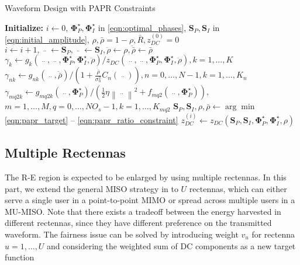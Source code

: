 \begin{algorithm}
  \caption{Waveform Design with PAPR Constraints}
  \label{alg:papr}
  \begin{algorithmic}[1]
    \State \textbf{Initialize:} $i \leftarrow 0$, ${\mathbf{\Phi }}_P^ \star ,{\mathbf{\Phi }}_I^ \star $ in \eqref{eqn:optimal_phases}, ${{{\mathbf{S}}_P},{{\mathbf{S}}_I}}$ in \eqref{eqn:initial_amplitude}, $\rho ,\bar \rho  = 1 - \rho ,\bar R,z_{DC}^{(0)} = 0$
    \Repeat
      \State $i \leftarrow i + 1,\mathop {{{\mathbf{S}}_P}}\limits^{..}  \leftarrow {{\mathbf{S}}_P},\mathop {{{\mathbf{S}}_I}}\limits^{..}  \leftarrow {{\mathbf{S}}_I},\ddot \rho  \leftarrow \rho ,\ddot{\bar{\rho}}  \leftarrow \bar \rho $
      \State ${\gamma _k} \leftarrow {g_k}\left( {\mathop {{{\mathbf{S}}_P}}\limits^{..} ,\mathop {{{\mathbf{S}}_I}}\limits^{..} ,{\mathbf{\Phi }}_P^ \star ,{\mathbf{\Phi }}_I^ \star ,\ddot \rho } \right)/{z_{DC}}\left( {\mathop {{{\mathbf{S}}_P}}\limits^{..} ,\mathop {{{\mathbf{S}}_I}}\limits^{..} ,{\mathbf{\Phi }}_P^ \star ,{\mathbf{\Phi }}_I^ \star ,\ddot \rho } \right),k = 1, \ldots ,K$
      \State ${\gamma _{nk}} \leftarrow {g_{nk}}\left( {\mathop {{{\mathbf{S}}_I}}\limits^{..} ,\ddot{\bar{\rho}}} \right)/\left( {1 + \frac{{\ddot{\bar{\rho}}}}{{\sigma _n^2}}{C_n}\left( {\mathop {{{\mathbf{S}}_I}}\limits^{..} } \right)} \right),n = 0, \ldots ,N - 1,k = 1, \ldots ,{K_n}$
      \State ${\gamma _{mq2k}} \leftarrow {g_{mq2k}}\left( {\mathop {{{\mathbf{S}}_P}}\limits^{..} ,{\mathbf{\Phi }}_P^ \star } \right)/\left( {\frac{1}{2}\eta {{\left\| {\mathop {{{\mathbf{s}}_{P,m}}}\limits^{..} } \right\|}^2} + {f_{mq2}}\left( {\mathop {{{\mathbf{S}}_P}}\limits^{..} ,{\mathbf{\Phi }}_P^ \star } \right)} \right),$ 
      \Statex $m = 1, \ldots ,M,q = 0, \ldots ,N{O_s} - 1,k = 1, \ldots ,{K_{mq2}}$
      \State ${{\mathbf{S}}_P},{{\mathbf{S}}_I},\rho ,\bar \rho  \leftarrow \arg \min $ \eqref{eqn:papr_target} -- \eqref{eqn:papr_ratio_constraint}
      \State $z_{DC}^{(i)} \leftarrow {z_{DC}}\left( {{{\mathbf{S}}_P},{{\mathbf{S}}_I},{\mathbf{\Phi }}_P^ \star ,{\mathbf{\Phi }}_I^ \star ,\rho } \right)$
  \end{algorithmic}
\end{algorithm} 



\subsection{Multiple Rectennas}\label{sec:multiple-rectennas}
The R-E region is expected to be enlarged by using multiple rectennas. In this part, we extend the general MISO strategy in \cite{Clerckx2018} to $U$ rectennas, which can either serve a single user in a point-to-point MIMO or spread across multiple users in a MU-MISO. Note that there exists a tradeoff between the energy harvested in different rectennas, since they have different preference on the transmitted waveform. The fairness issue can be solved by introducing weight ${v_u}$ for rectenna $u = 1, \ldots ,U$ and considering the weighted sum of DC components as a new target function

